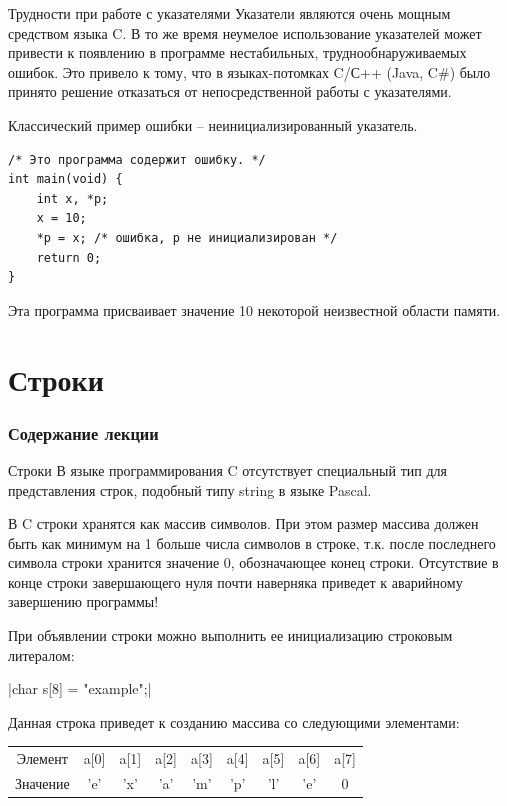 \documentclass{beamer}
\begin{document}
\begin{frame}[fragile]{Трудности при работе с указателями}
    Указатели являются очень мощным средством языка C. В то же время
    неумелое использование указателей может привести к появлению в
    программе нестабильных, труднообнаруживаемых ошибок. Это привело к тому, что в языках-потомках C/С++ (Java, C#) было принято решение отказаться от непосредственной работы с указателями.
    
    \medskip
    Классический пример ошибки – неинициализированный указатель.
\begin{verbatim}
/* Это программа содержит ошибку. */
int main(void) {
    int x, *p;
    x = 10;
    *p = x; /* ошибка, p не инициализирован */
    return 0;
}
\end{verbatim}

    \medskip
    Эта программа присваивает значение 10 некоторой неизвестной области памяти.
\end{frame}

\section{Строки}

\begin{frame}
  \frametitle{Содержание лекции}
  \tableofcontents[current]
\end{frame}

\begin{frame}{Строки}
    В языке программирования C отсутствует специальный тип для представления строк, подобный типу string в языке Pascal.
    
    \medskip
    В C строки хранятся как массив символов. При этом размер массива должен быть как минимум на 1 больше числа символов в строке, т.к. после последнего символа строки хранится значение 0, обозначающее конец строки. Отсутствие в конце строки завершающего нуля почти
    наверняка приведет к аварийному завершению программы!
    
    \medskip
    При объявлении строки можно выполнить ее инициализацию строковым
    литералом:
    
    |char s[8] = "example";|
                          
    Данная строка приведет к созданию массива со следующими элементами:
    \begin{tabular}{c c c c c c c c c}
    Элемент & a[0] & a[1] & a[2] & a[3] & a[4] & a[5] & a[6] & a[7]
    \\
    Значение & 'e' & 'x' & 'a' & 'm' & 'p' & 'l' & 'e' & 0
    \end{tabular}
\end{frame}
\end{document}
